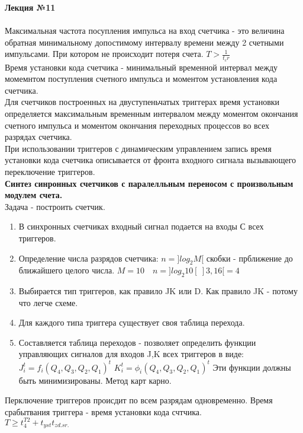 

\LARGE{ \textbf {Лекция №11}}\\
\Large{ \textbf {}}\\

Максимальная частота посупления импульса на вход счетчика - это величина обратная
минимальному допостимому интервалу времени между 2 счетными импульсами.
При котором не происходит потеря счета.
$T > \frac{1}{t_cr}$\\
Время установки кода счетчика - минимальный временной интервал между момемнтом поступления
счетного импульса и моментом установления кода счетчика.\\

Для счетчиков построенных на двуступеньчатых триггерах время установки определяется максимальным
временным интервалом между моментом окончания счетного импульса и моментом окончания переходных процессов во всех разрядах счетчика.\\
При использовании триггеров с динамическим управлением запись время установки кода счетчика
описывается от фронта входного сигнала вызывающего переключение триггеров.\\
\textbf{Синтез синронных счетчиков с паралелльным переносом с произвольным модулем счета.}\\
Задача - построить счетчик.
\begin{enumerate}
  \item В синхронных счетчиках входный сигнал подается на входы С всех триггеров.
  \item Определение числа разрядов счетчика: $n = ]log_2 M[$ скобки - прближение до ближайшего целого числа.
  $M =10 \quad n = ]log_2 10 [~]3,16[ = 4 $
  \item Выбирается тип триггеров, как правило JK или D.
  Как правило JK - потому что легче схеме.
  \item Для каждого типа триггера существует своя таблица перехода.
  \item Составляется таблица переходов - позволяет определить функции управляющих сигналов для входов J,K всех триггеров в виде:
  $ J_i^t = f_i(Q_4,Q_3,Q_2,Q_1)^t$  $ K_i^t = \phi_i(Q_4,Q_3,Q_2,Q_1)^t$
  Эти функции должны быть минимизированы. Метод карт карно.
\end{enumerate}

Перключение триггеров происдит по всем разрядам одновременно.
Время срабытвания триггера - время установки кода счтчика.\\
$T \geq t_4^{T2} + t_{yst} t_{zd.sr.}$\\


